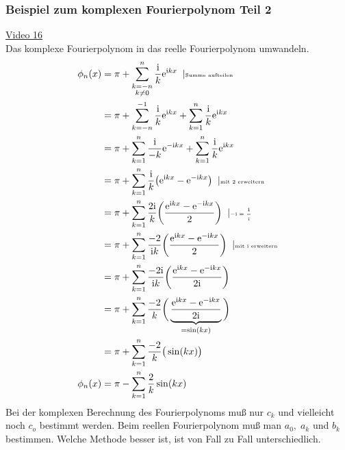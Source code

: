 \subsubsection{Beispiel zum komplexen Fourierpolynom Teil 2}
\href{https://youtu.be/Ln1HFYRNBsw}{Video 16}\\
Das komplexe Fourierpolynom in das reelle Fourierpolynom umwandeln.\\
\begin{align*}
\phi_n(x)&=\pi+\sum\limits_{\substack{k=-n\\k\neq 0}}^{n}\frac{\mathrm{i}}{k}\mathrm{e}^{\mathrm{i}kx}\;\;\arrowvert\text{\tiny Summe aufteilen }\\
&=\pi+\sum\limits_{k=-n}^{-1}\frac{\mathrm{i}}{k}\mathrm{e}^{\mathrm{i}kx}+\sum\limits_{k=1}^{n}\frac{\mathrm{i}}{k}\mathrm{e}^{\mathrm{i}kx}\\
&=\pi+\sum\limits_{k=1}^{n}\frac{\mathrm{i}}{-k}\mathrm{e}^{-\mathrm{i}kx}+\sum\limits_{k=1}^{n}\frac{\mathrm{i}}{k}\mathrm{e}^{\mathrm{i}kx}\\
&=\pi+\sum\limits_{k=1}^{n}\frac{\mathrm{i}}{k}\big(\mathrm{e}^{\mathrm{i}kx}-\mathrm{e}^{-\mathrm{i}kx}\big)\;\;\arrowvert\text{\tiny mit 2 erweitern }\\
&=\pi+\sum\limits_{k=1}^{n}\frac{2\mathrm{i}}{k}\bigg(\frac{\mathrm{e}^{\mathrm{i}kx}-\mathrm{e}^{-\mathrm{i}kx}}{2}\bigg)\;\;\arrowvert\text{\tiny $-\mathrm{i}=\frac{1}{\mathrm{i}}$ }\\
&=\pi+\sum\limits_{k=1}^{n}\frac{-2}{\mathrm{i}k}\bigg(\frac{\mathrm{e}^{\mathrm{i}kx}-\mathrm{e}^{-\mathrm{i}kx}}{2}\bigg)\;\;\lvert\text{\tiny mit $ \mathrm{i} $ erweitern}\\
&=\pi+\sum\limits_{k=1}^{n}\frac{-2\mathrm{i}}{\mathrm{i}k}\bigg(\frac{\mathrm{e}^{\mathrm{i}kx}-\mathrm{e}^{-\mathrm{i}kx}}{2\mathrm{i}}\bigg)\\
&=\pi+\sum\limits_{k=1}^{n}\frac{-2}{k}\bigg(\underbrace {\frac{\mathrm{e}^{\mathrm{i}kx}-\mathrm{e}^{-\mathrm{i}kx}}{2\mathrm{i}}}_{=\sin(kx)}\bigg)\\
&=\pi+\sum\limits_{k=1}^{n}\frac{-2}{k}\big(\sin(kx)\big)\\
\phi_n(x)&=\pi-\sum\limits_{k=1}^{n}\frac{2}{k}\sin(kx)\\
\end{align*}
Bei der komplexen Berechnung des Fourierpolynoms muß nur $ c_k $ und vielleicht noch $ c_o $ bestimmt werden. Beim reellen Fourierpolynom muß man $ a_0,\;a_k $ und $ b_k $ bestimmen. Welche Methode besser ist, ist von Fall zu Fall unterschiedlich.\\